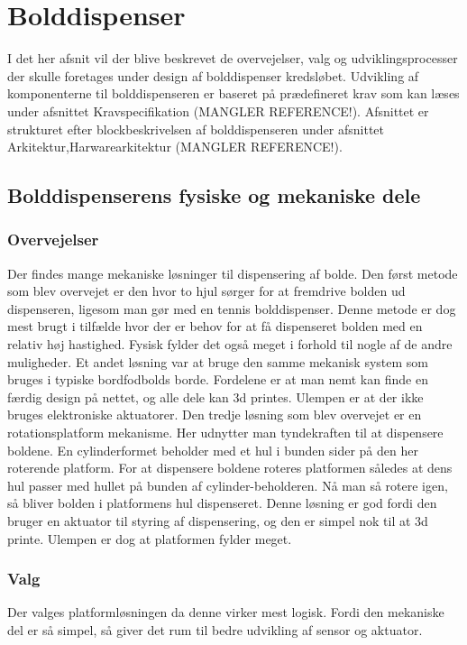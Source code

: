 \documentclass[HardwareDesign/HardwareDesign_main.tex]{subfiles}
\begin{document}
\section{Bolddispenser}
I det her afsnit vil der blive beskrevet de overvejelser, valg og udviklingsprocesser der skulle foretages under design af bolddispenser kredsløbet. Udvikling af komponenterne til bolddispenseren er baseret på prædefineret krav som kan læses under afsnittet Kravspecifikation (MANGLER REFERENCE!). Afsnittet er strukturet efter blockbeskrivelsen af bolddispenseren under afsnittet Arkitektur,Harwarearkitektur (MANGLER REFERENCE!).

\subsection{Bolddispenserens fysiske og mekaniske dele}
\subsubsection{Overvejelser}
Der findes mange mekaniske løsninger til dispensering af bolde. Den først metode som blev overvejet er den hvor to hjul sørger for at fremdrive bolden ud dispenseren, ligesom man gør med en tennis bolddispenser. Denne metode er dog mest brugt i tilfælde hvor der er behov for at få dispenseret bolden med en relativ høj hastighed. Fysisk fylder det også meget i forhold til nogle af de andre muligheder. Et andet løsning var at bruge den samme mekanisk system som bruges i typiske bordfodbolds borde. Fordelene er at man nemt kan finde en færdig design på nettet, og alle dele kan 3d printes. Ulempen er at der ikke bruges elektroniske aktuatorer.
Den tredje løsning som blev overvejet er en rotationsplatform mekanisme. Her udnytter man tyndekraften til at dispensere boldene. En cylinderformet beholder med et hul i bunden sider på den her roterende platform. For at dispensere boldene roteres platformen således at dens hul passer med hullet på bunden af cylinder-beholderen. Nå man så rotere igen, så bliver bolden i platformens hul dispenseret. Denne løsning er god fordi den bruger en aktuator til styring af dispensering, og den er simpel nok til at 3d printe. Ulempen er dog at platformen fylder meget.

\subsubsection{Valg}
Der valges platformløsningen da denne virker mest logisk. Fordi den mekaniske del er så simpel, så giver det rum til bedre udvikling af sensor og aktuator.
\end{document}
